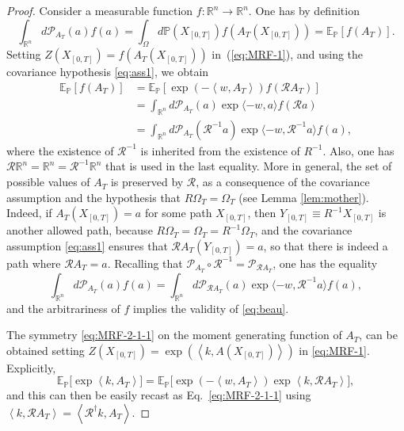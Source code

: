 \documentclass[a4paper,11pt]{article}
\numberwithin{equation}{section}
\begin{document}
\begin{proof}

Consider a measurable function $f: \mathbb{R}^n \to \mathbb{R}^n$. One has by definition
\begin{equation}
    \int_{\mathbb{R}^n} d\mathcal{P}_{A_T}(a) f(a) = \int_{\Omega} d\mathbb{P}(X_{\left[0,T\right]}) f(A_T(X_{\left[0,T\right]})) = \mathbb{E}_{\mathbb{P}}\left[f(A_T)\right] .
\end{equation}
Setting $Z\left(X_{\left[0,T\right]}\right)= f(A_T(X_{\left[0,T\right]})) $ 
in~(\ref{eq:MRF-1}), and using the covariance hypothesis \eqref{eq:ass1}, we obtain
\begin{align}\label{eq:MRF-1-1}
\mathbb{E}_{\mathbb{P}}\left[f(A_T)\right] &= \mathbb{E}_{\mathbb{P}}\left[\exp\left(-\left\langle w ,A_T \right\rangle \right) f(\mathcal{R}A_T)\right] \nonumber \\
&=  \int_{\mathbb{R}^n} d\mathcal{P}_{A_T}(a) \exp\langle -w, a \rangle f(\mathcal{R} a) \nonumber \\
&=  \int_{\mathbb{R}^n} d\mathcal{P}_{A_T}(\mathcal{R}^{-1} a) \exp\langle -w, \mathcal{R}^{-1} a \rangle f(a) ,
\end{align}
where the existence of $\mathcal{R}^{-1}$ is inherited from the existence of $R^{-1}$. Also, one has $\mathcal{R}\mathbb{R}^n = \mathbb{R}^n = \mathcal{R}^{-1}\mathbb{R}^n$ that is used in the last equality. More in general, the set of possible values of $A_T$ is preserved by $\mathcal{R}$, as a consequence of the covariance assumption and the hypothesis that $R\Omega_T=\Omega_T$ (see Lemma \ref{lem:mother}). Indeed, if $A_T(X_{\left[0,T\right]}) = a$ for some path $X_{\left[0,T\right]}$, then $Y_{\left[0,T\right]} \equiv R^{-1} X_{\left[0,T\right]}$ is another allowed path, because $R\Omega_T=\Omega_T=R^{-1}\Omega_T$, and the covariance assumption \eqref{eq:ass1} ensures that $\mathcal{R}A_T(Y_{\left[0,T\right]}) = a$, so that there is indeed a path where $\mathcal{R}A_T= a$.
Recalling that $\mathcal{P}_{A_T} \circ \mathcal{R}^{-1}= \mathcal{P}_{\mathcal{R}A_T} $, one has the equality
\begin{equation}
    \int_{\mathbb{R}^n} d\mathcal{P}_{A_T}(a) f(a) = \int_{\mathbb{R}^n} d\mathcal{P}_{\mathcal{R}A_T}(a) \exp\langle -w, \mathcal{R}^{-1} a \rangle f(a) ,
\end{equation}
and the arbitrariness of $f$ implies the validity of \eqref{eq:beau}.

The symmetry \eqref{eq:MRF-2-1-1} on the moment generating function of $A_T$, can be obtained setting $Z\left(X_{\left[0,T\right]}\right)=\exp\left(\left\langle k ,A\left(X_{\left[0,T\right]}\right)\right\rangle \right)$
in \eqref{eq:MRF-1}. Explicitly,
\begin{equation}\label{eq:MRF-2-1}
\mathbb{E}_{\mathbb{P}}\Big[\exp\left\langle k ,A_T\right\rangle \Big]=\mathbb{E}_{\mathbb{P}}\Big[\exp\left(-\left\langle w,A_T\right\rangle \right)\exp\left\langle k ,\mathcal{R}A_T\right\rangle \Big],
\end{equation}
and this can then be easily recast as Eq.~\eqref{eq:MRF-2-1-1} using $\left\langle k ,\mathcal{R}A_T\right\rangle = \left\langle \mathcal{R}^\dag k ,A_T\right\rangle$.
\end{proof}
\end{document}
